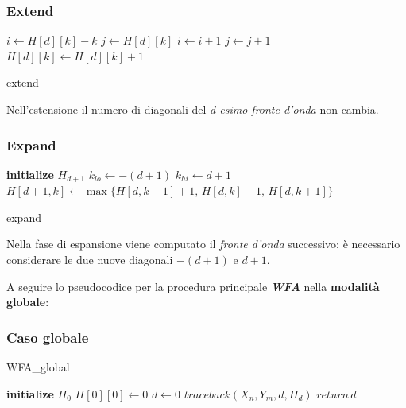 \subsubsection{Extend}
    \begin{algorithm}[H]
         {
            $i \gets H[d][k] - k$\;
            $j \gets H[d][k]$\;
             {
                $i \gets i + $1\;
                $j \gets j + 1$\;
                $H[d][k] \gets H[d][k] + 1$\;
            }
        }
    \caption{extend}
    \label{alg:extend}
    \end{algorithm}
    Nell'estensione il numero di diagonali del \emph{d-esimo fronte d'onda} non cambia.
    
\subsubsection{Expand}
    \begin{algorithm}[H]
        \textbf{initialize} $H_{d+1}$\;
        $k_{lo} \gets -(d + 1)$\;
        $k_{hi} \gets d + 1$\;
         {
            $H[d + 1, k] \gets \max\{H[d, k - 1] + 1, \, H[d, k] + 1, \, H[d, k + 1]\}$\;
        }
        \caption{expand}
        \label{alg:wf_expand}
    \end{algorithm}
    Nella fase di espansione viene computato il \emph{fronte d'onda} successivo: è necessario considerare le due nuove diagonali $-(d+1)$ e $d+1$.
    
    \vspace{20pt}
    A seguire lo pseudocodice per la procedura  principale \textbf{\textit{WFA}} nella \textbf{modalità globale}:
\subsubsection{Caso globale}
    \begin{algorithm}[H]
        \caption{WFA\_global}
        \label{alg:wfa_global}
        \textbf{initialize} $H_0$\;
        $H[0][0] \gets 0$\;
        $d \gets 0$\;
        $traceback(X_n, Y_m, d, H_d)$\;
        $return \, d$\;
    \end{algorithm}

